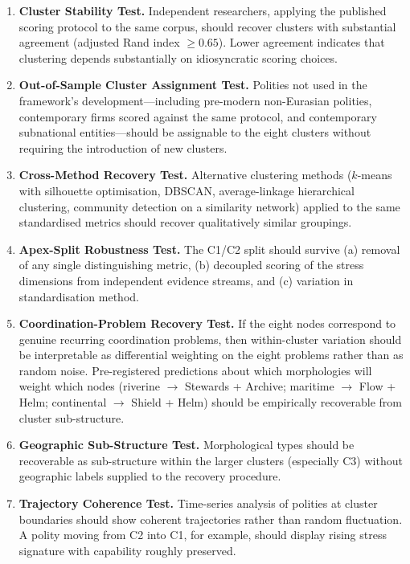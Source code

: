 \documentclass[12pt,a4paper]{article}
\begin{document}
\begin{enumerate}[leftmargin=1.8em, label=\textbf{\arabic*.}]

\item \textbf{Cluster Stability Test.} Independent researchers, applying the published scoring protocol to the same corpus, should recover clusters with substantial agreement (adjusted Rand index $\geq 0.65$). Lower agreement indicates that clustering depends substantially on idiosyncratic scoring choices.

\item \textbf{Out-of-Sample Cluster Assignment Test.} Polities not used in the framework's development---including pre-modern non-Eurasian polities, contemporary firms scored against the same protocol, and contemporary subnational entities---should be assignable to the eight clusters without requiring the introduction of new clusters.

\item \textbf{Cross-Method Recovery Test.} Alternative clustering methods ($k$-means with silhouette optimisation, DBSCAN, average-linkage hierarchical clustering, community detection on a similarity network) applied to the same standardised metrics should recover qualitatively similar groupings.

\item \textbf{Apex-Split Robustness Test.} The C1/C2 split should survive (a) removal of any single distinguishing metric, (b) decoupled scoring of the stress dimensions from independent evidence streams, and (c) variation in standardisation method.

\item \textbf{Coordination-Problem Recovery Test.} If the eight nodes correspond to genuine recurring coordination problems, then within-cluster variation should be interpretable as differential weighting on the eight problems rather than as random noise. Pre-registered predictions about which morphologies will weight which nodes (riverine $\rightarrow$ Stewards + Archive; maritime $\rightarrow$ Flow + Helm; continental $\rightarrow$ Shield + Helm) should be empirically recoverable from cluster sub-structure.

\item \textbf{Geographic Sub-Structure Test.} Morphological types should be recoverable as sub-structure within the larger clusters (especially C3) without geographic labels supplied to the recovery procedure.

\item \textbf{Trajectory Coherence Test.} Time-series analysis of polities at cluster boundaries should show coherent trajectories rather than random fluctuation. A polity moving from C2 into C1, for example, should display rising stress signature with capability roughly preserved.

\end{enumerate}
\end{document}

